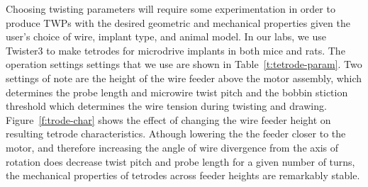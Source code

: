 \documentclass[11pt,a4paper]{article}
\begin{document}
Choosing twisting parameters will require some experimentation in order to
produce TWPs with the desired geometric and mechanical properties given the
user's choice of wire, implant type, and animal model. In our labs, we use
Twister3 to make tetrodes for microdrive implants in both mice and rats. The
operation settings settings that we use are shown in
Table~\ref{t:tetrode-param}.  Two settings of note are the height of the wire
feeder above the motor assembly, which determines the probe length and
microwire twist pitch and the bobbin stiction threshold which determines the
wire tension during twisting and drawing.  Figure~\ref{f:trode-char} shows the
effect of changing the wire feeder height on resulting tetrode characteristics.
Athough lowering the the feeder closer to the motor, and therefore increasing
the angle of wire divergence from the axis of rotation does decrease twist
pitch and probe length for a given number of turns, the mechanical properties
of tetrodes across feeder heights are remarkably stable.
\end{document}

